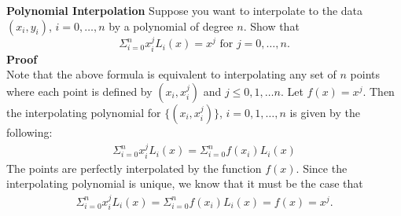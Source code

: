 \textbf{Polynomial Interpolation} Suppose you want to interpolate to the data $(x_i, y_i)$, $i = 0, \ldots, n$ by a polynomial of degree $n$. Show that $$ \Sigma_{i = 0}^n x_i^j L_i(x) = x^j \text{ for } j = 0, \ldots, n.$$
\textbf{Proof} \\ 
Note that the above formula is equivalent to interpolating any set of $n$ points where each point is defined by $(x_i, x_i^j)$ and $j \leq 0, 1, \ldots n$. Let $f(x) = x^j$. Then the interpolating polynomial for $\{(x_i, x_i^j)\}$, $i = 0, 1, \ldots , n$ is given by the following:
\begin{align*}
\Sigma_{i = 0}^n x_i^j L_i(x) = \Sigma_{i = 0}^n f(x_i) L_i(x)
\end{align*}
The points are perfectly interpolated by the function $f(x)$. Since the interpolating polynomial is unique, we know that it must be the case that 
\begin{align*}
\Sigma_{i = 0}^n x_i^j L_i(x) = \Sigma_{i = 0}^n f(x_i) L_i(x) = f(x) = x^j.
\end{align*} 


